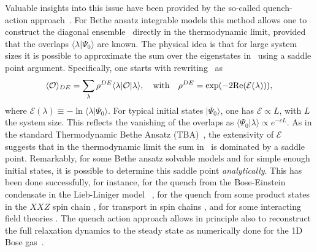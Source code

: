 \documentclass[11pt]{iopart}
\begin{document}
Valuable insights into this issue have been provided by the so-called quench-action 
approach~\cite{caux-2013}. For Bethe ansatz integrable models this method allows one 
to construct the diagonal ensemble~ directly in the thermodynamic 
limit, provided that the overlaps $\langle\lambda|\Psi_0\rangle$ are known. The 
physical idea is that for large system sizes it is possible to approximate the sum 
over the eigenstates in~ using a saddle point argument. Specifically, 
one starts with rewriting~ as 
%
\begin{equation}
\label{de1}
\langle{\mathcal O}\rangle_{DE}= \sum\limits_{\lambda}\rho^{DE}\langle\lambda|
{\mathcal O}|\lambda\rangle,\quad\textrm{with}\quad\rho^{DE}=\exp(-2{\rm Re}({\mathcal 
E}(\lambda))), 
\end{equation}
%
where ${\mathcal E}(\lambda)\equiv-\ln\langle\lambda|\Psi_0\rangle$. 
For typical initial states $|\Psi_0\rangle$,
one has ${\mathcal E}\propto L$, with $L$ the system size. This reflects the 
vanishing of the overlaps as $\langle\Psi_0|\lambda\rangle\propto e^{-c L}$.  
As in the standard Thermodynamic Bethe Ansatz (TBA)~\cite{taka-book}, the 
extensivity of ${\mathcal E}$ suggests that in the thermodynamic limit the 
sum in~ is dominated by a saddle point. Remarkably, for some Bethe 
ansatz solvable models and for simple enough initial states, it is possible to 
determine this saddle point {\it analytically}. This has been done successfully, 
for instance, for the quench from the Bose-Einstein condensate
 in the Lieb-Liniger model ~\cite{de-nardis-2014,ga-15,pce-2015,b-15}, 
 for the quench from some product states in the $XXZ$ spin chain \cite{pozsgay-2014A,wouters-2014A}, 
for transport in spin chains \cite{de_luca}, and for some interacting field theories \cite{bse-14}.  
The quench action approach allows in principle also to reconstruct the full relaxation dynamics to the steady state \cite{caux-2013}
as numerically done for the 1D Bose gas~\cite{de-nardis-2015a,de-nardis-2015}. 
\end{document}
